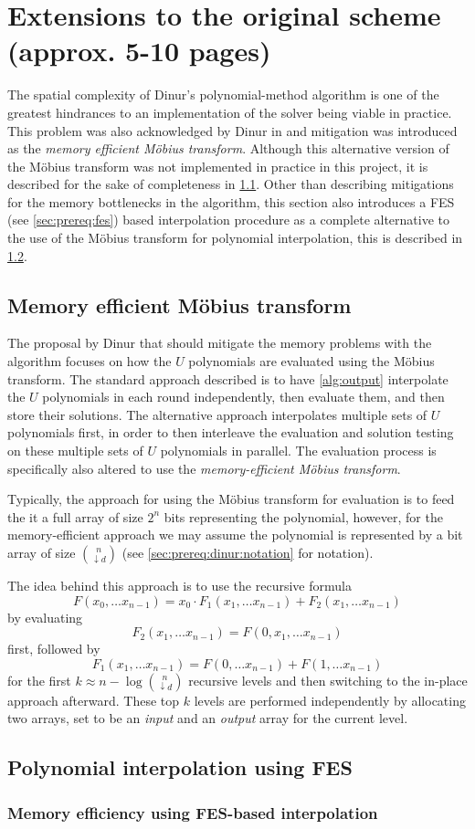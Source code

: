 \section{Extensions to the original scheme (approx. 5-10 pages)} \label{sec:ext}
The spatial complexity of Dinur's polynomial-method algorithm is one of the greatest hindrances to an implementation of the solver being viable in practice. This problem was also acknowledged by Dinur in \cite{cryptoeprint:2021/578} and mitigation was introduced as the \textit{memory efficient Möbius transform}. Although this alternative version of the Möbius transform was not implemented in practice in this project, it is described for the sake of completeness in \cref{sec:ext:mem_mob}. Other than describing mitigations for the memory bottlenecks in the algorithm, this section also introduces a FES (see \cref{sec:prereq:fes}) based interpolation procedure as a complete alternative to the use of the Möbius transform for polynomial interpolation, this is described in \cref{sec:ext:fes_interp}.
 
\subsection{Memory efficient Möbius transform} \label{sec:ext:mem_mob}
The proposal by Dinur that should mitigate the memory problems with the algorithm focuses on how the $U$ polynomials are evaluated using the Möbius transform. The standard approach described is to have \cref{alg:output} interpolate the $U$ polynomials in each round independently, then evaluate them, and then store their solutions. The alternative approach interpolates multiple sets of $U$ polynomials first, in order to then interleave the evaluation and solution testing on these multiple sets of $U$ polynomials in parallel. The evaluation process is specifically also altered to use the \textit{memory-efficient Möbius transform}.

Typically, the approach for using the Möbius transform for evaluation is to feed the it a full array of size $2^n$ bits representing the polynomial, however, for the memory-efficient approach we may assume the polynomial is represented by a bit array of size $\binom{n}{\downarrow d}$ (see \cref{sec:prereq:dinur:notation} for notation). 

The idea behind this approach is to use the recursive formula 
$$
    F(x_0, \dots x_{n - 1}) = x_0 \cdot F_1(x_1,\dots x_{n - 1}) + F_2(x_1,\dots x_{n - 1})
$$
by evaluating
$$
    F_2(x_1, \dots x_{n - 1}) = F(0, x_1, \dots x_{n - 1})
$$ 
first, followed by 
$$
    F_1(x_1, \dots x_{n - 1}) = F(0,\dots x_{n-1}) + F(1, \dots x_{n - 1})$$
for the first $k \approx n - \log \binom{n}{\downarrow d}$ recursive levels and then switching to the in-place approach afterward. These top $k$ levels are performed independently by allocating two arrays, set to be an \textit{input} and an \textit{output} array for the current level.
 
\subsection{Polynomial interpolation using FES} \label{sec:ext:fes_interp}

\subsubsection{Memory efficiency using FES-based interpolation} \label{sec:ext:mem_dinur}

\newpage
